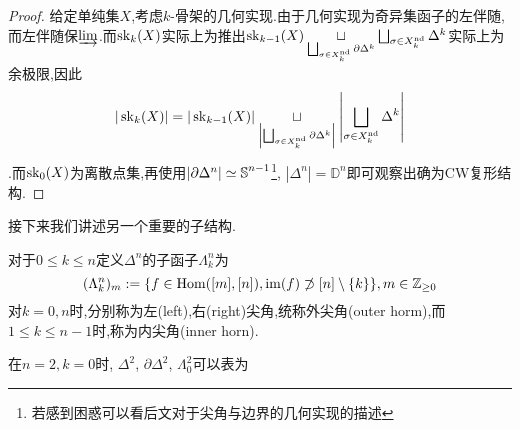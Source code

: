 \begin{proof}
    给定单纯集$X$,考虑$k$-骨架的几何实现.由于几何实现为奇异集函子的左伴随,而左伴随保$\underrightarrow{\lim}$.而$\operatorname{sk}_k(X)$实际上为推出$\operatorname{sk}_{k-1}(X) \underset{\bigsqcup_{\sigma \in X_k^{\operatorname{nd}}}\partial \Delta^k}{\sqcup} \bigsqcup_{\sigma \in X_k^{\operatorname{nd}}}\Delta^k$实际上为余极限,因此\[|\operatorname{sk}_k(X)|=|\operatorname{sk}_{k-1}(X)| \underset{\left|\bigsqcup_{\sigma \in X_k^{\operatorname{nd}}}\partial \Delta^k\right|}{\sqcup} \left|\bigsqcup_{\sigma \in X_k^{\operatorname{nd}}}\Delta^k\right|\].而$\operatorname{sk}_0(X)$为离散点集,再使用$|\partial \Delta^n| \simeq \operatorname{\mathbb{S}}^{n-1}$\footnote{若感到困惑可以看后文对于尖角与边界的几何实现的描述}, $|\Delta^n| = \mathbb{D}^{n}$即可观察出确为CW复形结构.
\end{proof}
接下来我们讲述另一个重要的子结构.
\begin{definition}
    对于$0\leq k \leq n$定义$\Delta^n$的子函子$\Lambda_k^n$为
    \[
    (\Lambda_k^n)_m := \{f\in \operatorname{Hom}([m],[n]), \operatorname{im}(f) \not\supset [n]\setminus\{k\}\},m \in \mathbb{Z}_{\geq 0}
    \]
    对$k=0,n$时,分别称为左(left),右(right)尖角,统称外尖角(outer horm),而$1\leq k \leq n-1$时,称为内尖角(inner horn).
\end{definition}
在$n=2,k=0$时, $\Delta^2$, $\partial \Delta^2$, $\Lambda_0^2$可以表为
